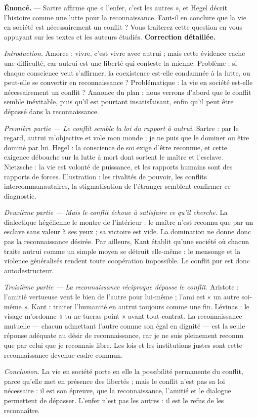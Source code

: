 \documentclass[11pt]{article}
\begin{document}
\begin{exoresolu}
\textbf{Énoncé.} — Sartre affirme que « l'enfer, c'est les autres », et Hegel décrit l'histoire comme une lutte pour la reconnaissance. Faut-il en conclure que la vie en société est nécessairement un conflit ? Vous traiterez cette question en vous appuyant sur les textes et les auteurs étudiés.
\tcblower
\textbf{Correction détaillée.}

\emph{Introduction.} Amorce : vivre, c'est vivre avec autrui ; mais cette évidence cache une difficulté, car autrui est une liberté qui conteste la mienne. Problème : si chaque conscience veut s'affirmer, la coexistence est-elle condamnée à la lutte, ou peut-elle se convertir en reconnaissance ? Problématique : la vie en société est-elle nécessairement un conflit ? Annonce du plan : nous verrons d'abord que le conflit semble inévitable, puis qu'il est pourtant insatisfaisant, enfin qu'il peut être dépassé dans la reconnaissance.

\emph{Première partie — Le conflit semble la loi du rapport à autrui.} Sartre : par le regard, autrui m'objective et vole mon monde ; je ne puis que le dominer ou être dominé par lui. Hegel : la conscience de soi exige d'être reconnue, et cette exigence débouche sur la lutte à mort dont sortent le maître et l'esclave. Nietzsche : la vie est volonté de puissance, et les rapports humains sont des rapports de forces. Illustration : les rivalités de pouvoir, les conflits intercommunautaires, la stigmatisation de l'étranger semblent confirmer ce diagnostic.

\emph{Deuxième partie — Mais le conflit échoue à satisfaire ce qu'il cherche.} La dialectique hégélienne le montre de l'intérieur : le maître n'est reconnu que par un esclave sans valeur à ses yeux ; sa victoire est vide. La domination ne donne donc pas la reconnaissance désirée. Par ailleurs, Kant établit qu'une société où chacun traite autrui comme un simple moyen se détruit elle-même : le mensonge et la violence généralisés rendent toute coopération impossible. Le conflit pur est donc autodestructeur.

\emph{Troisième partie — La reconnaissance réciproque dépasse le conflit.} Aristote : l'amitié vertueuse veut le bien de l'autre pour lui-même ; l'ami est « un autre soi-même ». Kant : traiter l'humanité en autrui toujours comme une fin. Lévinas : le visage m'ordonne « tu ne tueras point » avant tout contrat. La reconnaissance mutuelle — chacun admettant l'autre comme son égal en dignité — est la seule réponse adéquate au désir de reconnaissance, car je ne suis pleinement reconnu que par celui que je reconnais libre. Les lois et les institutions justes sont cette reconnaissance devenue cadre commun.

\emph{Conclusion.} La vie en société porte en elle la possibilité permanente du conflit, parce qu'elle met en présence des libertés ; mais le conflit n'est pas sa loi nécessaire : il est son épreuve, que la reconnaissance, l'amitié et le dialogue permettent de dépasser. L'enfer n'est pas les autres : il est le refus de les reconnaître.
\end{exoresolu}
\end{document}
